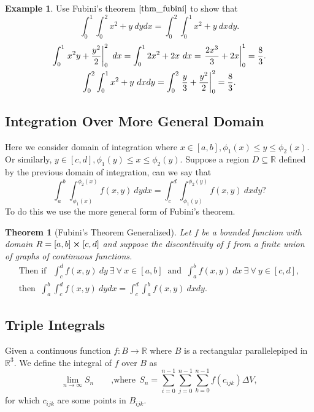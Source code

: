 \documentclass[
	12pt,
	]{article}
\makeatletter
\newcommand{\R}{\mathbb{R}}
\theoremstyle{custom}
\newtheorem{theorem}{Theorem}[section]
\theoremstyle{custom}
\theoremstyle{custom}
\theoremstyle{custom}
\theoremstyle{custom}
\theoremstyle{definition}
\newtheorem{example}{Example}[section]
\theoremstyle{example}
\theoremstyle{note}
\theoremstyle{remark}
\theoremstyle{example}
\newcounter{theo}[section]\setcounter{theo}{0}
\numberwithin{equation}{subsection}
\def\label#1{\@bsphack
			  \protected@write\@auxout{}%
			         {\string\newlabel{#1}{{\@currentlabel}{\thepage}}}%
			  \@esphack}
\makeatother
\begin{document}
	   		 \begin{example}
	   		 	Use Fubini's theorem $\eqref{thm_fubini}$ to show that 
	   		 	$$ \int_{0}^{1} \int_{0}^{2} x^{2}+y \ dy dx = \int_{0}^{2}\int_{0}^{1} x^{2}+y \ dx dy.$$
	   		 	\begin{gather*}
	   		 		\int_{0}^{1} \eval{x^{2}y + \frac{y^{2}}{2} }_{0}^{2} \ dx = \int_{0}^{1} 2x^{2}+ 2x \ dx = \eval{\frac{2x^{3}}{3} + 2x}_{0}^{1} = \frac83 .\\
	   		 		\int_{0}^{2}\int_{0}^{1} x^{2}+ y \ dx dy = \int_{0}^{2} \eval{\frac{y}{3} + \frac{y^{2}}{2}}_{0}^{2} = \frac83 .
	   		 	\end{gather*}
	   		 \end{example}
	   		 
	   		 \subsection{Integration Over More General Domain }
  			      Here we consider domain of integration where $x\in [a,b] , \phi_{1}(x) \le y \le \phi_{2}(x)$. Or similarly, $y\in [c,d] , \phi_{1}(y) \le x \le \phi_{2}(y)$. Suppose a region $D \subseteq \R$ defined by the previous domain of integration, can we say that 
  			      $$ \int_{a}^{b}\int_{\phi_{1}(x)}^{\phi_{2}(x)} f(x,y) \ dydx = \int_{c}^{d}\int_{\phi_{1}(y)}^{\phi_{2}(y)} f(x,y) \ dxdy ?$$
  			      To do this we use the more general form of Fubini's theorem.
  			  
  			\begin{theorem}[Fubini's Theorem Generalized]
  			\label{thm_fubini_generalized}
  				Let $f$ be a bounded function with domain $R = [a,b] \cross [c,d]$ and suppose the discontinuity of $f$ from a finite union of graphs of continuous functions. 
  				\begin{gather}
  					\text{Then if } \ \ \int_{c}^{d}f(x,y) \ dy \ \exists \ \forall \ x\in [a,b] \ \text{ and } \ \int_{a}^{b} f(x,y) \ dx \ \exists \ \forall \ y \in [c,d] ,\nonumber \\
  					\text{then } \ \int_{a}^{b}\int_{c}^{d}f(x,y) \ dydx = \int_{c}^{d}\int_{a}^{b}f(x,y) \ dxdy. 
   				\end{gather}
  			\end{theorem}
  			
  			\subsection{Triple Integrals}
  				Given a continuous function $f : B \to \R$ where $B$ is a rectangular parallelepiped in $\R^{3}$. We define the integral of $f$ over $B$ as 
  				$$ \lim_{n\to \infty}S_{n} \qquad \text{,where} \ \ S_{n} = \sum_{i=0}^{n-1}\sum_{j=0}^{n-1}\sum_{k=0}^{n-1} f(c_{ijk})\Delta V,$$
  				for which $c_{ijk}$ are some points in $B_{ijk}$.
  				
\end{document}
